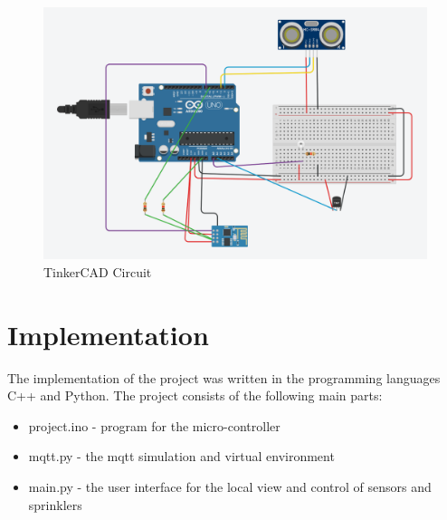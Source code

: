 \documentclass{article}
\begin{document}
\begin{figure}
\centering
\includegraphics[scale=0.3]{scheme_cropped.png}
\caption{TinkerCAD Circuit}
\label{fig:scheme}
\end{figure}
\section{Implementation}
The implementation of the project was written in the programming languages C++ and Python. The project consists of the following main parts:
\begin{itemize}
\item project.ino - program for the micro-controller
\item mqtt.py - the mqtt simulation and virtual environment
\item main.py - the user interface for the local view and control of sensors and sprinklers
\end{itemize}
\end{document}
